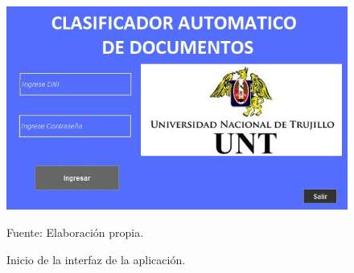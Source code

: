 \begin{figure}[h!]
	\centering
		\includegraphics[scale=0.7]{imagenes/interfazApp.jpeg}
		\caption{Inicio de la interfaz de la aplicación.}
		\begin{center}
    Fuente: Elaboración propia.
    \end{center}
	\label{fig:InterfazApp}
\end{figure}




